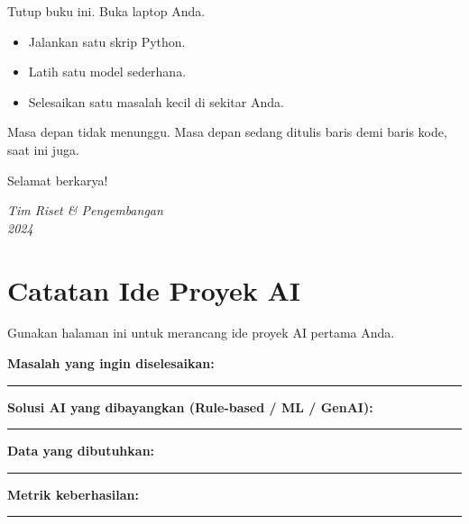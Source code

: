 Tutup buku ini. Buka laptop Anda.
\begin{itemize}
    \item Jalankan satu skrip Python.
    \item Latih satu model sederhana.
    \item Selesaikan satu masalah kecil di sekitar Anda.
\end{itemize}

Masa depan tidak menunggu. Masa depan sedang ditulis baris demi baris kode, saat ini juga.

Selamat berkarya!

\vspace{2cm}
\begin{center}
    \textit{Tim Riset \& Pengembangan} \\
    \textit{2024}
\end{center}

\newpage
\chapter*{Catatan Ide Proyek AI}
Gunakan halaman ini untuk merancang ide proyek AI pertama Anda.

\vspace{1cm}
\textbf{Masalah yang ingin diselesaikan:}
\vspace{3cm}
\hrule

\vspace{1cm}
\textbf{Solusi AI yang dibayangkan (Rule-based / ML / GenAI):}
\vspace{3cm}
\hrule

\vspace{1cm}
\textbf{Data yang dibutuhkan:}
\vspace{3cm}
\hrule

\vspace{1cm}
\textbf{Metrik keberhasilan:}
\vspace{2cm}
\hrule
